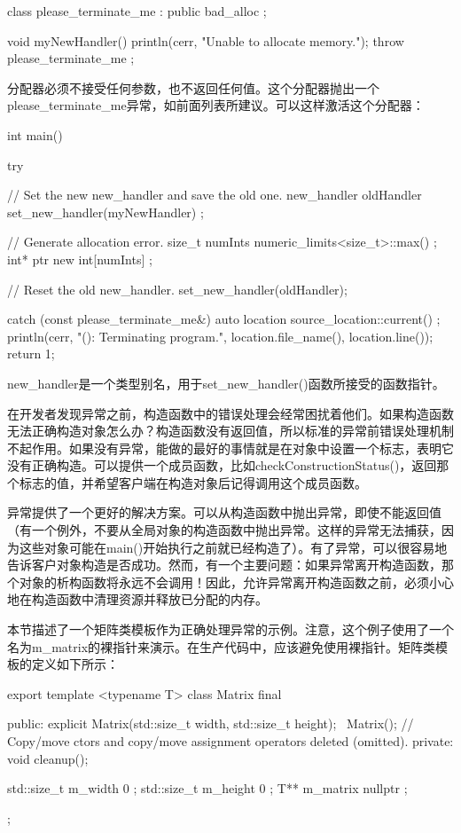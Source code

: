 \begin{cpp}
class please_terminate_me : public bad_alloc { };

void myNewHandler()
{
    println(cerr, "Unable to allocate memory.");
    throw please_terminate_me {};
}
\end{cpp}

分配器必须不接受任何参数，也不返回任何值。这个分配器抛出一个please\_terminate\_me异常，如前面列表所建议。可以这样激活这个分配器：

\begin{cpp}
int main()
{
    try {
        // Set the new new_handler and save the old one.
        new_handler oldHandler { set_new_handler(myNewHandler) };

        // Generate allocation error.
        size_t numInts { numeric_limits<size_t>::max() };
        int* ptr { new int[numInts] };

        // Reset the old new_handler.
        set_new_handler(oldHandler);
    } catch (const please_terminate_me&) {
        auto location { source_location::current() };
        println(cerr, "{}({}): Terminating program.",
            location.file_name(), location.line());
        return 1;
    }
}
\end{cpp}

new\_handler是一个类型别名，用于set\_new\_handler()函数所接受的函数指针。


在开发者发现异常之前，构造函数中的错误处理会经常困扰着他们。如果构造函数无法正确构造对象怎么办？构造函数没有返回值，所以标准的异常前错误处理机制不起作用。如果没有异常，能做的最好的事情就是在对象中设置一个标志，表明它没有正确构造。可以提供一个成员函数，比如checkConstructionStatus()，返回那个标志的值，并希望客户端在构造对象后记得调用这个成员函数。

异常提供了一个更好的解决方案。可以从构造函数中抛出异常，即使不能返回值（有一个例外，不要从全局对象的构造函数中抛出异常。这样的异常无法捕获，因为这些对象可能在main()开始执行之前就已经构造了）。有了异常，可以很容易地告诉客户对象构造是否成功。然而，有一个主要问题：如果异常离开构造函数，那个对象的析构函数将永远不会调用！因此，允许异常离开构造函数之前，必须小心地在构造函数中清理资源并释放已分配的内存。

本节描述了一个矩阵类模板作为正确处理异常的示例。注意，这个例子使用了一个名为m\_matrix的裸指针来演示。在生产代码中，应该避免使用裸指针。矩阵类模板的定义如下所示：

\begin{cpp}
export template <typename T>
class Matrix final
{
    public:
        explicit Matrix(std::size_t width, std::size_t height);
        ~Matrix();
        // Copy/move ctors and copy/move assignment operators deleted (omitted).
    private:
        void cleanup();

        std::size_t m_width { 0 };
        std::size_t m_height { 0 };
        T** m_matrix { nullptr };
};
\end{cpp}


